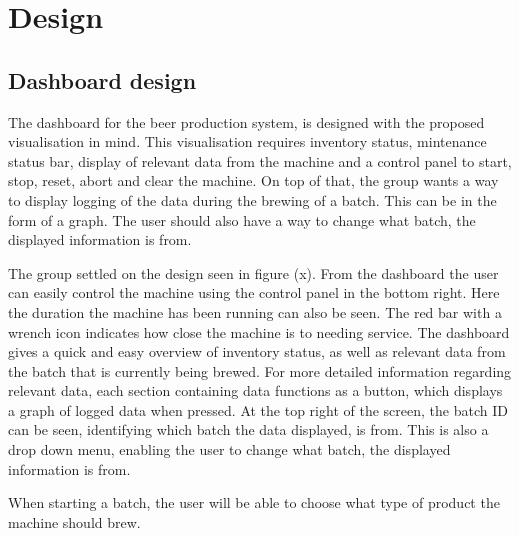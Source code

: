 \section{Design}

\subsection{Dashboard design}
The dashboard for the beer production system, is designed with
the proposed visualisation in mind. This visualisation requires inventory
status, mintenance status bar, display of relevant data from the machine and
a control panel to start, stop, reset, abort and clear the machine. On top of
that, the group wants a way to display logging of the data during the brewing
of a batch. This can be in the form of a graph. The user should also have a
way to change what batch, the displayed information is from.

The group settled on the design seen in figure (x). From the dashboard the user
can easily control the machine using the control panel in the bottom right.
Here the duration the machine has been running can also be seen. The red bar
with a wrench icon indicates how close the machine is to needing service. The
dashboard gives a quick and easy overview of inventory status, as well as
relevant data from the batch that is currently being brewed. For more detailed
information regarding relevant data, each section containing data functions as
a button, which displays a graph of logged data when pressed. At the top right
of the screen, the batch ID can be seen, identifying which batch the data
displayed, is from. This is also a drop down menu, enabling the user to change
what batch, the displayed information is from.

When starting a batch, the user will be able to choose what type of product the
machine should brew.